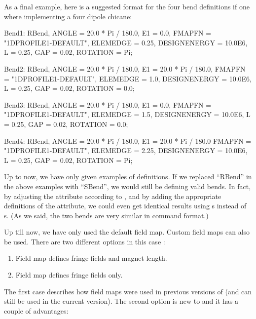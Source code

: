 As a final  example, here is a suggested format for the four bend definitions if one where implementing
a four dipole chicane:

\begin{example}
Bend1: RBend, ANGLE = 20.0 * Pi / 180.0,
              E1 = 0.0,
	      FMAPFN = "1DPROFILE1-DEFAULT",
	      ELEMEDGE = 0.25,
	      DESIGNENERGY = 10.0E6,
	      L = 0.25,
	      GAP = 0.02,
              ROTATION = Pi;

Bend2: RBend, ANGLE = 20.0 * Pi / 180.0,
              E1 = 20.0 * Pi / 180.0,
	      FMAPFN = "1DPROFILE1-DEFAULT",
	      ELEMEDGE = 1.0,
	      DESIGNENERGY = 10.0E6,
	      L = 0.25,
	      GAP = 0.02,
              ROTATION = 0.0;

Bend3: RBend, ANGLE = 20.0 * Pi / 180.0,
              E1 = 0.0,
	      FMAPFN = "1DPROFILE1-DEFAULT",
	      ELEMEDGE = 1.5,
	      DESIGNENERGY = 10.0E6,
	      L = 0.25,
	      GAP = 0.02,
              ROTATION = 0.0;

Bend4: RBend, ANGLE = 20.0 * Pi / 180.0,
              E1 = 20.0 * Pi / 180.0
	      FMAPFN = "1DPROFILE1-DEFAULT",
	      ELEMEDGE = 2.25,
	      DESIGNENERGY = 10.0E6,
	      L = 0.25,
	      GAP = 0.02,
              ROTATION = Pi;
\end{example}

Up to now, we have only given examples of  definitions. If we replaced ``RBend'' in the above
examples with ``SBend'', we would still be defining valid \opalt bends. In fact, by adjusting the 
attribute according to , and by adding the appropriate
definitions of the  attribute, we could even get identical results using s instead of
s. (As we said, the two bends are very similar in command format.)

Up till now, we have only used the default field map. Custom field maps can also be used. There are two
different options in this case :

\begin{enumerate}
\item Field map defines fringe fields and magnet length.
\item Field map defines fringe fields only.
\end{enumerate}
The first case describes how field maps were used in previous versions of \opal (and can still be used in
the current version). The second option is new to \opal {} and it has a couple of advantages:

